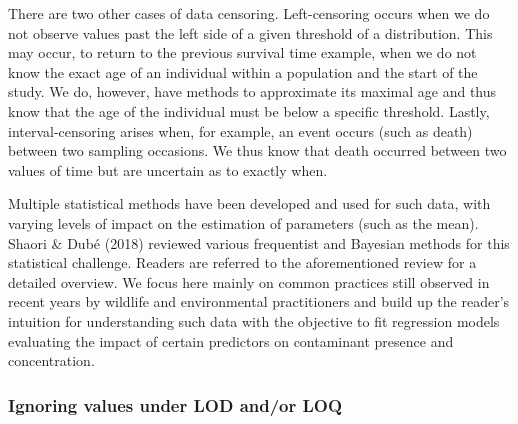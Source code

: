 \documentclass[
]{article}
\begin{document}
There are two other cases of data censoring. Left-censoring occurs when
we do not observe values past the left side of a given threshold of a
distribution. This may occur, to return to the previous survival time
example, when we do not know the exact age of an individual within a
population and the start of the study. We do, however, have methods to
approximate its maximal age and thus know that the age of the individual
must be below a specific threshold. Lastly, interval-censoring arises
when, for example, an event occurs (such as death) between two sampling
occasions. We thus know that death occurred between two values of time
but are uncertain as to exactly when.

Multiple statistical methods have been developed and used for such data,
with varying levels of impact on the estimation of parameters (such as
the mean). Shaori \& Dubé (2018) reviewed various frequentist and
Bayesian methods for this statistical challenge. Readers are referred to
the aforementioned review for a detailed overview. We focus here mainly
on common practices still observed in recent years by wildlife and
environmental practitioners and build up the reader's intuition for
understanding such data with the objective to fit regression models
evaluating the impact of certain predictors on contaminant presence and
concentration.

\subsubsection{Ignoring values under LOD and/or
LOQ}\label{ignoring-values-under-lod-andor-loq}
\end{document}

